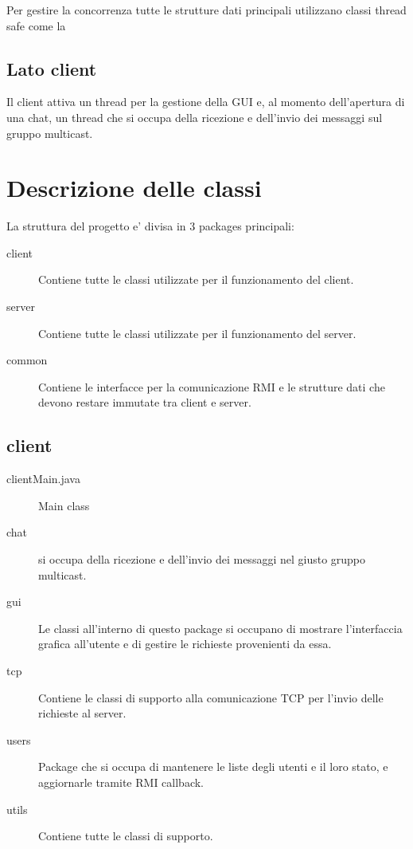 Per gestire la concorrenza tutte le strutture dati principali utilizzano classi thread safe come la 
\section*{Lato client}
Il client attiva un thread per la gestione della GUI e, al momento dell'apertu\-ra di una chat, un thread che si occupa della ricezione e dell'invio dei messaggi sul gruppo multicast.

\chapter*{Descrizione delle classi}

La struttura del progetto e' divisa in 3 packages principali:
\begin{description}
    \item[client] Contiene tutte le classi utilizzate per il funzionamento del client.
    \item[server] Contiene tutte le classi utilizzate per il funzionamento del server.
    \item[common] Contiene le interfacce per la comunicazione RMI e le strutture dati che devono restare immutate tra client e server.
\end{description}
\section*{client}


\begin{description}
    \item[clientMain.java] {\color{red}Main class}
    \item[chat] si occupa della ricezione e dell'invio dei messaggi nel giusto gruppo multicast.
    \item[gui] Le classi all'interno di questo package si occupano di mostrare l'interfac\-cia grafica all'utente e di gestire le richieste provenienti da essa.
    \item[tcp] Contiene le classi di supporto alla comunicazione TCP per l'invio delle richieste al server.
    \item[users] Package che si occupa di mantenere le liste degli utenti e il loro stato, e aggiornarle tramite RMI callback.
    \item[utils] Contiene tutte le classi di supporto.
\end{description}

